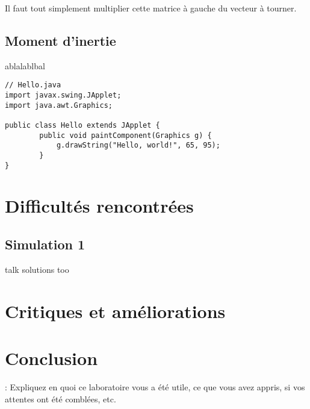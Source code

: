 \documentclass{article}
\begin{document}
Il faut tout simplement multiplier cette matrice à gauche du vecteur à tourner.
\subsection{Moment d'inertie}
ablalablbal
\begin{lstlisting}
// Hello.java
import javax.swing.JApplet;
import java.awt.Graphics;

public class Hello extends JApplet {
		public void paintComponent(Graphics g) {
			g.drawString("Hello, world!", 65, 95);
		}    
}
\end{lstlisting}
\section{Difficultés rencontrées}
\subsection{Simulation 1}
talk solutions too

 \section{Critiques et améliorations}


\section{Conclusion}
: Expliquez en quoi ce laboratoire vous a été utile, ce que vous avez appris, si vos attentes ont
été comblées, etc.
\end{document}
